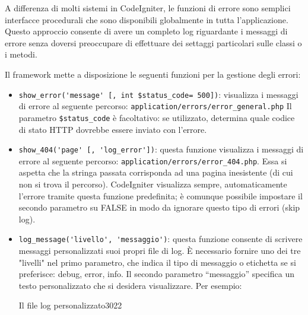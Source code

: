 A differenza di molti sistemi in CodeIgniter, le funzioni di errore sono semplici interfacce procedurali che sono disponibili globalmente in tutta l'applicazione. Questo approccio consente di avere un completo log riguardante i messaggi di errore senza doversi preoccupare di effettuare dei settaggi particolari sulle classi o i metodi.

Il framework mette a disposizione le seguenti funzioni per la gestione degli errori:

\begin{itemize}
\item \verb|show_error('message' [, int $status_code= 500])|: visualizza i messaggi di errore al seguente percorso: \verb|application/errors/error_general.php| Il parametro \verb|$status_code| è facoltativo: se utilizzato, determina quale codice di stato HTTP dovrebbe essere inviato con l'errore.

\item \verb|show_404('page' [, 'log_error'])|: questa funzione visualizza i messaggi di errore al seguente percorso: \verb|application/errors/error_404.php|. Essa si aspetta che la stringa passata corrisponda ad una pagina inesistente (di cui non si trova il percorso). CodeIgniter visualizza sempre, automaticamente l'errore tramite questa funzione predefinita; è comunque possibile impostare il secondo parametro su FALSE in modo da ignorare questo tipo di errori (skip log).

\item \verb|log_message('livello', 'messaggio')|: questa funzione consente di scrivere messaggi personalizzati suoi propri file di log. È necessario fornire uno dei tre "livelli" nel primo parametro, che indica il tipo di messaggio o etichetta se si preferisce: debug, error, info. Il secondo parametro ``messaggio'' specifica un testo personalizzato che si desidera visualizzare. Per esempio:


\begin{img}{Il file log personalizzato}{3}{022}
\end{img}


\end{itemize}
